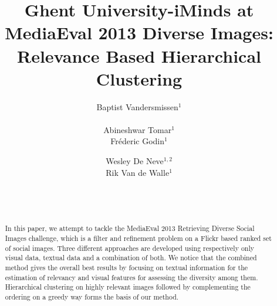 \documentclass{acm_proc_article-me11_tweaked}
\begin{document}

\title{Ghent University-iMinds at MediaEval 2013 Diverse Images: Relevance Based Hierarchical Clustering}

\author{
\alignauthor
Baptist Vandersmissen$^1$\\
\\    
\alignauthor
Abineshwar Tomar$^1$ \\
\alignauthor
Fr\'ederic Godin$^1$\\
\and  %
\alignauthor
Wesley De Neve$^{1,2}$\\
\alignauthor
Rik Van de Walle$^1$\\
\and
\\
\\ 
}
\maketitle
  \begin{abstract}
In this paper, we attempt to tackle the MediaEval 2013 Retrieving Diverse Social Images challenge, which is a filter and refinement problem on a Flickr based ranked set of social images.
Three different approaches are developed using respectively only visual data, textual data and a combination of both.
We notice that the combined method gives the overall best results by focusing on textual information for the estimation of relevancy and visual features for assessing the diversity among them.
Hierarchical clustering on highly relevant images followed by complementing the ordering on a greedy way forms the basis of our method.
\end{abstract}
% 
% 
\end{document}
